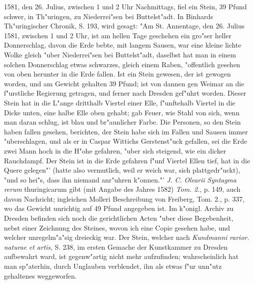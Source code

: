 \documentclass[a4paper, 11pt, oneside, polutonikogreek, german]{article}
\begin{document}
1581, den 26. Julius, zwischen 1 und 2 Uhr Nachmittags, fiel ein Stein, 39 Pfund schwer, in Th"uringen, zu Niederrei"sen bei Buttelst"adt. In Binhards Th"uringischer Chronik, S. 193, wird gesagt: "Am St. Annentage, den 26. Julius 1581, zwischen 1 und 2 Uhr, ist am hellen Tage geschehen ein gro"ser heller Donnerschlag, davon die Erde bebte, mit langem Sausen, war eine kleine lichte Wolke gleich "uber Niederrei"sen bei Buttelst"adt, daselbst hat man in einem solchen Donnerschlag etwas schwarzes, gleich einem Raben, "offentlich gesehen von oben herunter in die Erde fallen. Ist ein Stein gewesen, der ist gewogen worden, und am Gewicht gehalten 39 Pfund; ist von dannen gen Weimar an die f"urstliche Regierung getragen, und ferner nach Dresden gef"uhrt worden. Dieser Stein hat in die L"ange dritthalb Viertel einer Elle, f"unftehalb Viertel in die Dicke unten, eine halbe Elle oben gehabt; gab Feuer, wie Stahl von sich, wenn man daran schlug, ist blau und br"aunlicher Farbe. Die Personen, so den Stein haben fallen gesehen, berichten, der Stein habe sich im Fallen und Sausen immer "uberschlagen, und als er in Caspar Wittichs Gerstenst"uck gefallen, sei die Erde zwei Mann hoch in die H"ohe gefahren, "uber sich steigend, wie ein dicker Rauchdampf. Der Stein ist in die Erde gefahren f"unf Viertel Ellen tief, hat in die Quere gelegen"' (hatte also vermutlich, weil er weich war, sich plattgedr"uckt), "und so hei"s, dass ihn niemand anr"uhren k"onnen."' \emph{J. C. Olearii Syntagma rerum} thuringicarum gibt (mit Angabe des Jahres 1582) \emph{Tom. 2.}, p. 149, auch davon Nachricht; ingleichen Molleri Beschreibung von Freiberg, Tom. 2., p. 337, wo das Gewicht unrichtig auf 49 Pfund angegeben ist. Im k"onigl. Archiv zu Dresden befinden sich noch die gerichtlichen Acten "uber diese Begebenheit, nebst einer Zeichnung des Steines, wovon ich eine Copie gesehen habe, und welcher unregelm"a"sig dreieckig war. Der Stein, welcher nach \emph{Kundmanni rarior. naturae et artis}, S. 238, im ersten Gemache der Kunstkammer zu Dresden aufbewahrt ward, ist gegenw"artig nicht mehr aufzufinden; wahrscheinlich hat man sp"aterhin, durch Unglauben verblendet, ihn als etwas f"ur unn"utz gehaltenes weggeworfen.
\end{document}
